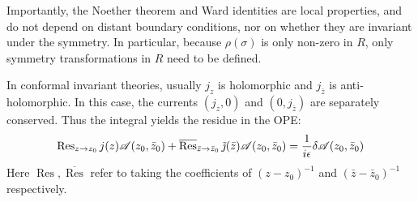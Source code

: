 Importantly, the Noether theorem and Ward identities are local properties, and do not depend on distant boundary conditions, nor on whether they are invariant under the symmetry. In particular, because $\rho(\sigma)$ is only non-zero in $R$, only symmetry transformations in $R$ need to be defined.    

In conformal invariant theories, usually $j_z$ is holomorphic and $j_{\bar{z}}$ is anti-holomorphic. In this case, the currents $(j_z,0)$ and $(0,j_{\bar{z}})$ are separately conserved.    
Thus the integral yields the residue in the OPE:    
\begin{equation}\label{2.3.11}
	\operatorname{Res}_{z \to z_{0}} j(z) \mathscr{A}(z_{0}, \bar{z}_{0})+\overline{\operatorname{Res}}_{\bar{z} \to \bar{z}_{0}} \, \tilde{\jmath}(\bar{z}) \mathscr{A}(z_{0}, \bar{z}_{0})=\frac{1}{i \epsilon} \delta \mathscr{A}(z_{0}, \bar{z}_{0})
\end{equation}
Here $\operatorname{Res},\overline{\operatorname{Res}}$ refer to taking the coefficients of $(z-z_{0})^{-1}$ and $(\bar{z}-\bar{z}_{0})^{-1}$ respectively.    

